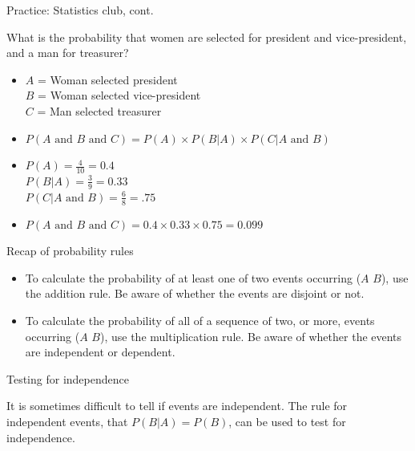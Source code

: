 \documentclass[xcolor=table, aspectratio=169, bigger, handout]{beamer}
\begin{document}
\begin{frame}{Practice: Statistics club, cont.}
\begin{exampleblock}{}
What is the probability that women are selected for president and vice-president, and a man for treasurer?
\begin{itemize}
\pause
\item $A$ = Woman selected president\\
$B$ = Woman selected vice-president\\
$C$ = Man selected treasurer
\pause
\item $P(A \text{ and } B \text{ and } C) = P(A) \times P(B|A) \times P(C | A \text{ and } B)$\\
\pause
\item $P(A) = \frac 4{10} = 0.4$\\
$P(B|A) = \frac 3 9 = 0.33$\\
$P(C | A \text{ and } B) = \frac 6 8 = .75$

\pause
\item $P(A \text{ and } B \text{ and } C) = 0.4 \times 0.33 \times 0.75 = 0.099$ 
\end{itemize}
\end{exampleblock}
\end{frame}

\begin{frame}{Recap of probability rules}
\begin{block}{}
\begin{itemize}
\item To calculate the probability of at least one of two events occurring ($A$  $B$), use the addition rule. Be aware of whether the events are disjoint or not.

\pause
\item To calculate  the probability of all of a sequence of two, or more, events occurring ($A$  $B$), use the multiplication rule. Be aware of whether the events are independent or dependent.
\end{itemize}
\end{block}
\end{frame}

\begin{frame}{Testing for independence}
\begin{block}{}
It is sometimes difficult to tell if events are independent. The rule for independent events, that $P(B|A) = P(B)$, can be used to test for independence.
\end{block}
\end{frame}
\end{document}
